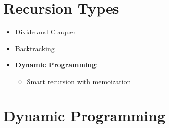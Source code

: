 
\section{Recursion Types}

\begin{itemize}
    \item Divide and Conquer
    \item Backtracking
    \item \textbf{Dynamic Programming}:
    \begin{itemize}
        \item Smart recursion with memoization
    \end{itemize}
\end{itemize}

\section{Dynamic Programming}

